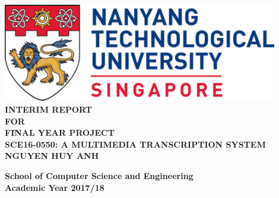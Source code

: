 \begin{titlepage}
\begin{center}

\includegraphics[width=0.9\textwidth]{images/ntu_logo.png}
\\[4cm]

\uppercase{\textbf{Interim Report}\\
\textbf{for}\\
\textbf{Final Year Project}
\\[2cm]
\textbf{SCE16-0550: A Multimedia Transcription System}
\\[2cm]
\textbf{Nguyen Huy Anh}
}

\vfill

\textbf{School of Computer Science and Engineering}
\\
\textbf{Academic Year 2017/18}

\end{center}
\end{titlepage}
